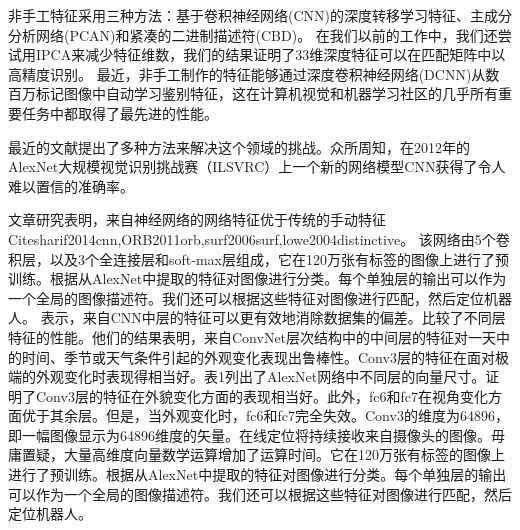 非手工特征采用三种方法：基于卷积神经网络(CNN)的深度转移学习特征、主成分分析网络(PCAN)和紧凑的二进制描述符(CBD)\cite{nanni2017handcraft}。 在我们以前的工作中，我们还尝试用IPCA来减少特征维数\cite{zhang2017Dynamic}，我们的结果证明了33维深度特征可以在匹配矩阵中以高精度识别。
最近，非手工制作的特征能够通过深度卷积神经网络(DCNN)从数百万标记图像中自动学习鉴别特征，这在计算机视觉和机器学习社区的几乎所有重要任务中都取得了最先进的性能\cite{Radford2016Unsuperved}\cite{Chen20143D}\cite{Krizhevsky2012ImageNet}\cite{Simonyan2014Very}\cite{Szegedy2015Going}\cite{He2015Deep}。%



最近的文献提出了多种方法来解决这个领域的挑战\cite{milford2012seqslam}\cite{corke2013dealing}\cite{neubert2015superpixel}\cite{mcmanus2015learning}\cite{naseer2014robust}\cite{churchill2012practice}\cite{lowry2014transforming}。众所周知，在2012年的AlexNet大规模视觉识别挑战赛（ILSVRC）上一个新的网络模型CNN获得了令人难以置信的准确率\cite{krizhevsky2012imagenet}。 

文章\cite{donahue2014decaf}\cite{girshick2014rich}\cite{krizhevsky2012imagenet}\cite{sermanet2013overfeat}研究表明，来自神经网络的网络特征优于传统的手动特征 Cite{sharif2014cnn,ORB2011orb,surf2006surf,lowe2004distinctive}。
该网络由5个卷积层，以及3个全连接层和soft-max层组成，它在120万张有标签的图像上进行了预训练。根据从AlexNet中提取的特征对图像进行分类。每个单独层的输出可以作为一个全局的图像描述符。我们还可以根据这些特征对图像进行匹配，然后定位机器人。
\cite{donahue2014decaf}表示，来自CNN中层的特征可以更有效地消除数据集的偏差。\cite{sunderhauf2015performance}比较了不同层特征的性能。他们的结果表明，来自ConvNet层次结构中的中间层的特征对一天中的时间、季节或天气条件引起的外观变化表现出鲁棒性。Conv3层的特征在面对极端的外观变化时表现得相当好。表1列出了AlexNet网络中不同层的向量尺寸。\cite{sunderhauf2015performance}证明了Conv3层的特征在外貌变化方面的表现相当好。此外，fc6和fc7在视角变化方面优于其余层。但是，当外观变化时，fc6和fc7完全失效。Conv3的维度为64896，即一幅图像显示为64896维度的矢量。在线定位将持续接收来自摄像头的图像。毋庸置疑，大量高维度向量数学运算增加了运算时间。它在120万张有标签的图像上进行了预训练。根据从AlexNet中提取的特征对图像进行分类。每个单独层的输出可以作为一个全局的图像描述符。我们还可以根据这些特征对图像进行匹配，然后定位机器人。

